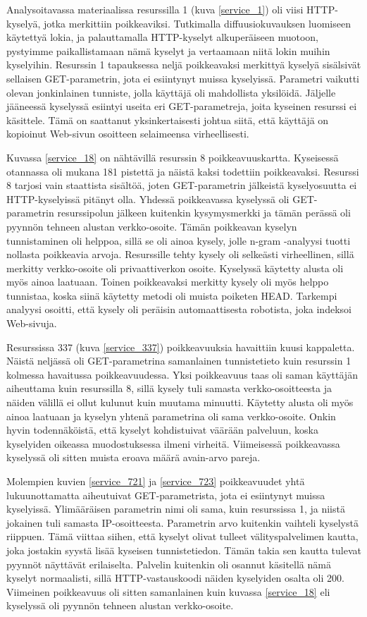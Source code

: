 Analysoitavassa materiaalissa resurssilla 1 (kuva \ref{service_1}) oli
viisi HTTP-kyselyä, jotka merkittiin poikkeaviksi. Tutkimalla
diffuusiokuvauksen luomiseen käytettyä lokia, ja palauttamalla
HTTP-kyselyt alkuperäiseen muotoon, pystyimme paikallistamaan nämä
kyselyt ja vertaamaan niitä lokin muihin kyselyihin. Resurssin 1
tapauksessa neljä poikkeavaksi merkittyä kyselyä sisälsivät sellaisen
GET-parametrin, jota ei esiintynyt muissa kyselyissä. Parametri
vaikutti olevan jonkinlainen tunniste, jolla käyttäjä oli mahdollista
yksilöidä. Jäljelle jääneessä kyselyssä esiintyi useita eri
GET-parametreja, joita kyseinen resurssi ei käsittele. Tämä on
saattanut yksinkertaisesti johtua siitä, että käyttäjä on kopioinut
Web-sivun osoitteen selaimeensa virheellisesti.

Kuvassa \ref{service_18} on nähtävillä resurssin 8 poikkeavuuskartta. Kyseisessä otannassa oli mukana 181 pistettä ja näistä kaksi todettiin poikkeavaksi.
Resurssi 8 tarjosi vain staattista sisältöä, joten GET-parametrin jälkeistä kyselyosuutta ei HTTP-kyselyissä pitänyt olla. Yhdessä poikkeavassa kyselyssä oli
GET-parametrin resurssipolun jälkeen kuitenkin kysymysmerkki ja tämän perässä oli pyynnön tehneen alustan verkko-osoite. Tämän poikkeavan kyselyn tunnistaminen
oli helppoa, sillä se oli ainoa kysely, jolle n-gram -analyysi tuotti
nollasta poikkeavia arvoja. Resurssille tehty kysely oli selkeästi virheellinen, sillä merkitty verkko-osoite 
oli privaattiverkon osoite. Kyselyssä käytetty alusta oli myös ainoa laatuaan. Toinen poikkeavaksi merkitty kysely oli myös helppo tunnistaa, koska siinä 
käytetty metodi oli muista poiketen HEAD. Tarkempi analyysi osoitti, että kysely oli peräisin automaattisesta robotista, joka indeksoi Web-sivuja. 

Resurssissa 337 (kuva \ref{service_337}) poikkeavuuksia havaittiin kuusi kappaletta. Näistä neljässä oli GET-parametrina samanlainen tunnistetieto
kuin resurssin 1 kolmessa havaitussa poikkeavuudessa. Yksi poikkeavuus taas oli saman käyttäjän aiheuttama kuin resurssilla 8, sillä kysely tuli samasta
verkko-osoitteesta ja näiden välillä ei ollut kulunut kuin muutama
minuutti. Käytetty alusta oli myös ainoa laatuaan ja kyselyn yhtenä parametrina oli 
sama verkko-osoite. Onkin hyvin todennäköistä, että kyselyt
kohdistuivat väärään palveluun, koska kyselyiden oikeassa muodostuksessa ilmeni
virheitä. Viimeisessä poikkeavassa kyselyssä oli sitten muista eroava määrä avain-arvo pareja.

Molempien kuvien \ref{service_721} ja \ref{service_723} poikkeavuudet yhtä lukuunottamatta
aiheutuivat GET-parametrista, jota ei esiintynyt muissa
kyselyissä. Ylimääräisen parametrin nimi oli sama, kuin resurssissa 1,
ja niistä jokainen tuli samasta IP-osoitteesta. Parametrin arvo
kuitenkin vaihteli kyselystä riippuen. Tämä viittaa siihen, että
kyselyt olivat tulleet välityspalvelimen kautta, joka jostakin syystä
lisää kyseisen tunnistetiedon. Tämän takia sen kautta tulevat pyynnöt
näyttävät erilaiselta. Palvelin kuitenkin oli osannut käsitellä nämä
kyselyt normaalisti, sillä HTTP-\-vastauskoodi näiden kyselyiden
osalta oli 200. Viimeinen poikkeavuus oli sitten samanlainen kuin kuvassa \ref{service_18} eli kyselyssä oli pyynnön tehneen alustan verkko-osoite.

